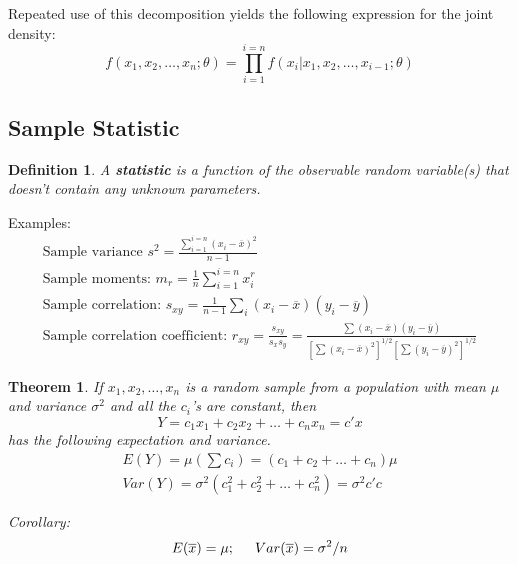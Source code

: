 \documentclass{article}
\newtheorem{definition}{Definition}[section]
\newtheorem{theorem}{Theorem}[section]
\begin{document}
Repeated use of this decomposition yields the following expression for the joint density:
\begin{equation*}
    f(x_1,x_2,\dots,x_n;\theta)=\prod_{i=1}^{i=n} f(x_i|x_1,x_2,\dots,x_{i-1};\theta)
\end{equation*}

\subsection{Sample Statistic}

\begin{definition}
    A \textbf{statistic} is a function of the observable random variable(s) that doesn't contain any unknown parameters.
\end{definition}

Examples:
\begin{equation*}
    \begin{split}
       \text{Sample variance } s^2=\frac{\sum_{i=1}^{i=n}(x_i-\overline{x})^2}{n-1} \\
       \text{Sample moments: } m_r=\frac{1}{n} \sum_{i=1}^{i=n}x_i^r \\
       \text{Sample correlation: } s_{xy}=\frac{1}{n-1} \sum_i(x_i - \overline{x})(y_i-\overline{y})\\
       \text{Sample correlation coefficient: } r_{xy}=\frac{s_{xy}}{s_x s_y} = \frac{\sum(x_i-\overline{x})(y_i-\overline{y})}{[\sum (x_i-\overline{x})^2]^{1/2} [\sum(y_i-\overline{y})^2]^{1/2}} 
    \end{split}
\end{equation*}

\begin{theorem}
    If \(x_1,x_2,\dots,x_n\) is a random sample from a population with mean \(\mu\) and variance \(\sigma^2\) and all the \(c_i\)'s are constant, then
    \begin{equation*}
        Y=c_1x_1+c_2x_2+\dots+c_nx_n=c'x
    \end{equation*}
    has the following expectation and variance.
    \begin{equation*}
        \begin{split}
            E(Y)=\mu (\sum c_i) = (c_1+c_2+\dots+c_n) \mu \\
            Var(Y)=\sigma^2(c_1^2+c_2^2+\dots+c_n^2)=\sigma^2c'c
        \end{split}
    \end{equation*}
\end{theorem}
\textit{Corollary:}
\begin{equation*}
    E(\overline{x})=\mu; \hspace{0.5cm} Var(\overline{x})=\sigma^2/n
\end{equation*}
\end{document}
